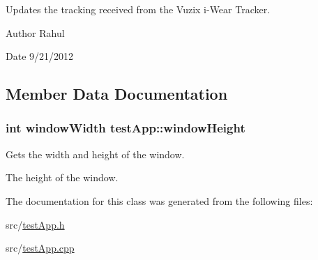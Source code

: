 Updates the tracking received from the Vuzix i-\/\-Wear Tracker. 

\begin{DoxyAuthor}{Author}
Rahul 
\end{DoxyAuthor}
\begin{DoxyDate}{Date}
9/21/2012 
\end{DoxyDate}


\subsection{Member Data Documentation}
\hypertarget{classtest_app_a31efaa85f8a900bb659a537d56c73e03}{
\subsubsection[{window\-Height}]{\setlength{\rightskip}{0pt plus 5cm}int window\-Width test\-App\-::window\-Height}}\label{classtest_app_a31efaa85f8a900bb659a537d56c73e03}


Gets the width and height of the window. 

The height of the window. 

The documentation for this class was generated from the following files\-:\begin{DoxyCompactItemize}
\item 
src/\hyperlink{test_app_8h}{test\-App.\-h}\item 
src/\hyperlink{test_app_8cpp}{test\-App.\-cpp}\end{DoxyCompactItemize}
